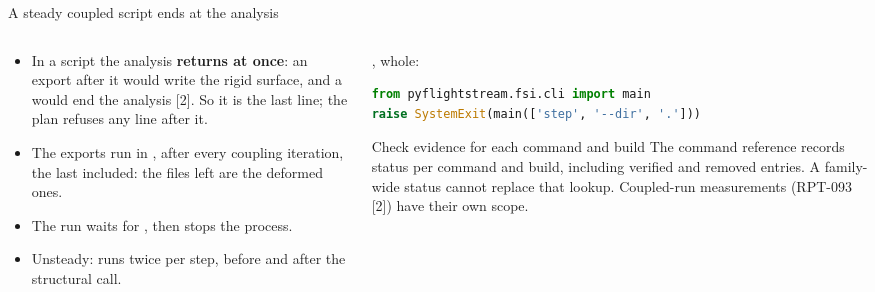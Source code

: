 \begin{frame}[fragile]{A steady coupled script ends at the analysis}
\begin{columns}[T]
\begin{column}{0.52\textwidth}
\begin{itemize}\footnotesize
  \item In a script the analysis \textbf{returns at once}: an export after it
        would write the rigid surface, and a  would
        end the analysis [2]. So it is the last line; the plan refuses any
        line after it.
  \item The exports run in , after every coupling
        iteration, the last included: the files left are the deformed ones.
  \item The run waits for , then stops the
        process.
  \item Unsteady:  runs twice per step, before and after
        the structural call.
\end{itemize}
\end{column}
\begin{column}{0.44\textwidth}
\scriptsize {}, whole:
\begin{lstlisting}[style=ftsbase, language=Python, basicstyle=\ttfamily\tiny]
from pyflightstream.fsi.cli import main
raise SystemExit(main(['step', '--dir', '.']))
\end{lstlisting}
\begin{alertblock}{Check evidence for each command and build}
\scriptsize The command reference records status per command and build,
including verified and removed entries. A family-wide status cannot replace
that lookup. Coupled-run measurements (RPT-093 [2]) have their own scope.
\end{alertblock}
\end{column}
\end{columns}
\end{frame}

